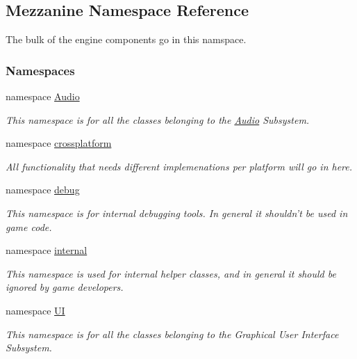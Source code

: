 \hypertarget{namespaceMezzanine}{
\subsection{Mezzanine Namespace Reference}
\label{namespaceMezzanine}
}


The bulk of the engine components go in this namspace.  


\subsubsection*{Namespaces}
\begin{DoxyCompactItemize}
\item 
namespace \hyperlink{namespaceMezzanine_1_1Audio}{Audio}


\begin{DoxyCompactList}\small\item\em This namespace is for all the classes belonging to the \hyperlink{namespaceMezzanine_1_1Audio}{Audio} Subsystem. \item\end{DoxyCompactList}

\item 
namespace \hyperlink{namespaceMezzanine_1_1crossplatform}{crossplatform}


\begin{DoxyCompactList}\small\item\em All functionality that needs different implemenations per platform will go in here. \item\end{DoxyCompactList}

\item 
namespace \hyperlink{namespaceMezzanine_1_1debug}{debug}


\begin{DoxyCompactList}\small\item\em This namespace is for internal debugging tools. In general it shouldn't be used in game code. \item\end{DoxyCompactList}

\item 
namespace \hyperlink{namespaceMezzanine_1_1internal}{internal}


\begin{DoxyCompactList}\small\item\em This namespace is used for internal helper classes, and in general it should be ignored by game developers. \item\end{DoxyCompactList}

\item 
namespace \hyperlink{namespaceMezzanine_1_1UI}{UI}


\begin{DoxyCompactList}\small\item\em This namespace is for all the classes belonging to the Graphical User Interface Subsystem. \item\end{DoxyCompactList}

\end{DoxyCompactItemize}
